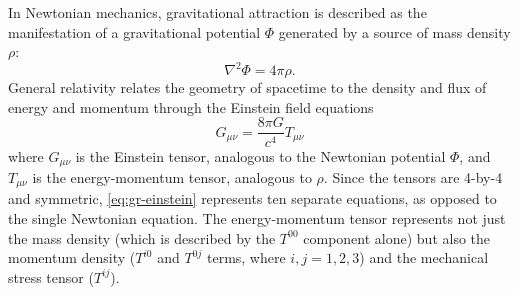 In Newtonian mechanics, gravitational attraction is described as the manifestation of a gravitational potential $\Phi$ generated by a source of mass density $\rho$:
\begin{equation}
	\nabla^2 \Phi = 4\pi\rho.
\end{equation}
General relativity relates the geometry of spacetime to the density and flux of energy and momentum through the Einstein field equations
\begin{equation}\label{eq:gr-einstein}
	G_{\mu\nu} = \frac{8\pi G}{c^4} T_{\mu\nu}
\end{equation}
where $G_{\mu\nu}$ is the Einstein tensor, analogous to the Newtonian potential $\Phi$, and $T_{\mu\nu}$ is the energy-momentum tensor, analogous to $\rho$.
Since the tensors are 4-by-4 and symmetric, \cref{eq:gr-einstein} represents ten separate equations, as opposed to the single Newtonian equation.
The energy-momentum tensor represents not just the mass density (which is described by the $T^{00}$ component alone) but also the momentum density ($T^{i0}$ and $T^{0j}$ terms, where $i,j = 1, 2, 3$) and the mechanical stress tensor ($T^{ij}$).

